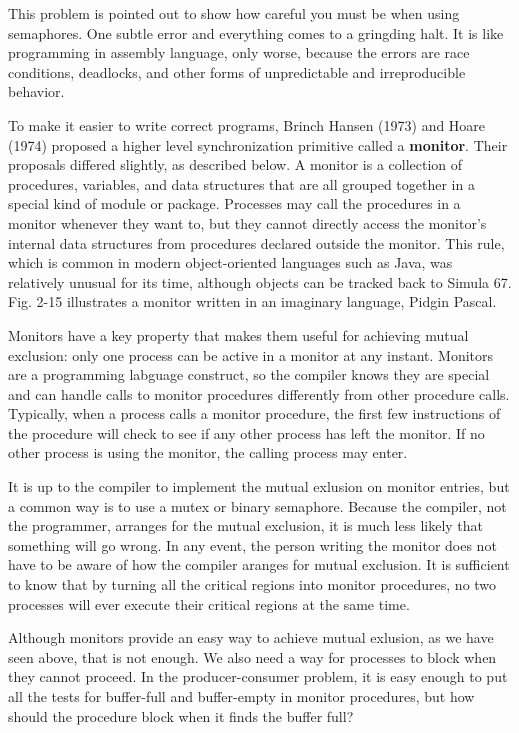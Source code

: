 \documentclass{book}
\newcommand {\kw}  [1] {\textbf{#1}}
\begin{document}
This problem is pointed out to show how careful you must be when using semaphores.
One subtle error and everything comes to a gringding halt.
It is like programming in assembly language, only worse, 
because the errors are race conditions, deadlocks, and other forms of unpredictable and irreproducible behavior.

To make it easier to write correct programs, Brinch Hansen (1973) and Hoare (1974) 
proposed a higher level synchronization primitive called a \kw{monitor}.
Their proposals differed slightly, as described below.
A monitor is a collection of procedures, variables, and data structures 
that are all grouped together in a special kind of module or package.
Processes may call the procedures in a monitor whenever they want to,
but they cannot directly access the monitor's internal data structures from procedures declared outside the monitor.
This rule, which is common in modern object-oriented languages such as Java, was relatively unusual for its time,
although objects can be tracked back to Simula 67.
Fig. 2-15 illustrates a monitor written in an imaginary language, Pidgin Pascal.

Monitors have a key property that makes them useful for achieving mutual exclusion: 
only one process can be active in a monitor at any instant.
Monitors are a programming labguage construct, so the compiler knows they are special 
and can handle calls to monitor procedures differently from other procedure calls.
Typically, when a process calls a monitor procedure, 
the first few instructions of the procedure will check to see if any other process has left the monitor.
If no other process is using the monitor, the calling process may enter.

It is up to the compiler to implement the mutual exlusion on monitor entries,
but a common way is to use a mutex or binary semaphore.
Because the compiler, not the programmer, arranges for the mutual exclusion, it is much less likely that something will go wrong.
In any event, the person writing the monitor does not have to be aware of how the compiler aranges for mutual exclusion.
It is sufficient to know that by turning all the critical regions into monitor procedures, 
no two processes will ever execute their critical regions at the same time.

Although monitors provide an easy way to achieve mutual exlusion, as we have seen above, that is not enough.
We also need a way for processes to block when they cannot proceed.
In the producer-consumer problem, it is easy enough to put all the tests for buffer-full and buffer-empty in monitor procedures,
but how should the procedure block when it finds the buffer full?
\end{document}
